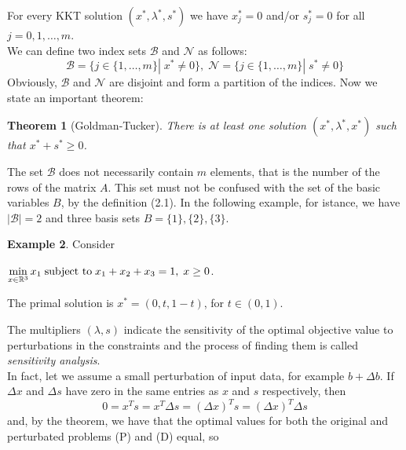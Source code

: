 \documentclass[a4paper,10 pt,titlepage,twoside]{book}
\theoremstyle{plain}
\newtheorem{thm}{Theorem}[chapter]
\theoremstyle{definition}
\newtheorem{ex}[thm]{Example}
\theoremstyle{remark}
\begin{document}
For every KKT solution $(x^{*}, \lambda^{*}, s^{*})$ we have $x_{j}^{*}= 0$ and/or $s_{j}^{*}= 0$ for all $j=0,1,\dots,m$.\\
We can define two index sets $\mathcal{B}$ and $\mathcal{N}$ as follows:
\begin{equation}\label{index}
\mathcal{B} =\{j\in\{1,\dots,m\}|\; x^{*} \not= 0\}, \;
\mathcal{N} =\{j\in\{1,\dots,m\}|\; s^{*} \not= 0\}
\end{equation}  
Obviously, $\mathcal{B}$ and $\mathcal{N}$ are disjoint and form a partition of the indices. Now we state an important theorem:
\begin{thm}[Goldman-Tucker]
	There is at least one solution $(x^{*}, \lambda^{*}, x^{*})$ such that $x^{*}+s^{*}\geq0$.
\end{thm}
The set $\mathcal{B}$ does not necessarily contain $m$ elements, that is the number of the rows of the matrix $A$. This set must not be confused with the set of the basic variables $B$, by the definition (2.1). In the following example, for istance, we have $|\mathcal{B}|= 2$ and three basis sets $B = \{1\}, \{2\}, \{3\}$.
\begin{ex}
Consider
\begin{center} $\min\limits_{x\in\mathbb{R}^{3}} x_{1} \text{\;subject to\;} x_{1}+x_{2}+x_{3} = 1,\; x\geq 0$.\end{center}
The primal solution is $x^{*}=(0, t, 1-t)$, for $t\in(0,1)$. 	
\end{ex} 

The multipliers $(\lambda,s)$ indicate the sensitivity of the optimal objective value  to perturbations in the constraints and the process of finding them is called \textit{sensitivity analysis}. \\ In fact, let we assume a small perturbation of input data, for example $b + \Delta b$. If $\Delta x$ and $\Delta s$ have zero in the same entries as $x$ and $s$ respectively, then
\begin{equation*}
0=x^{T}s=x^{T}\Delta s= \left( \Delta x\right)^{T}s=\left( \Delta x\right)^{T}\Delta s
\end{equation*}
and, by the theorem, we have that the optimal values for both the original and perturbated problems (P) and (D) equal, so
\end{document}
